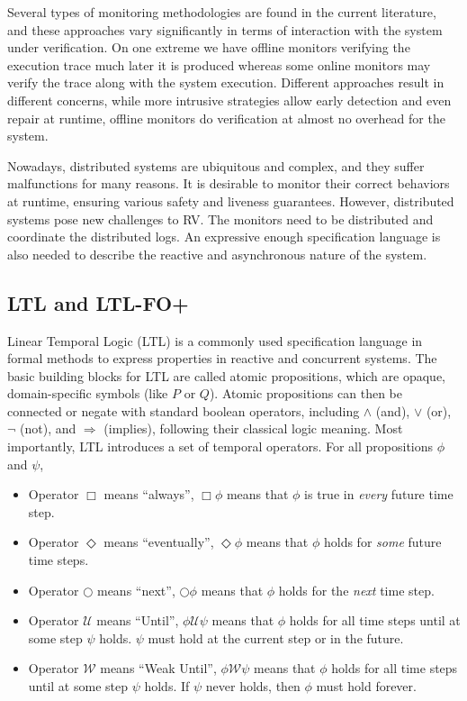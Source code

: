 \documentclass[format=acmsmall, nonacm=true, review=true, screen=true]{acmart}
\begin{document}
Several types of monitoring methodologies are found in the current literature, and these approaches vary significantly in terms of interaction with the system under verification. On one extreme we have offline monitors verifying the execution trace much later it is produced whereas some online monitors may verify the trace along with the system execution. Different approaches result in different concerns, while more intrusive strategies allow early detection and even repair at runtime, offline monitors do verification at almost no overhead for the system.

Nowadays, distributed systems are ubiquitous and complex, and they suffer malfunctions for many reasons. It is desirable to monitor their correct behaviors at runtime, ensuring various safety and liveness guarantees. However, distributed systems pose new challenges to RV. The monitors need to be distributed and coordinate the distributed logs. An expressive enough specification language is also needed to describe the reactive and asynchronous nature of the system.

\subsection{LTL and LTL-FO+}
Linear Temporal Logic (LTL) is a commonly used specification language in formal methods to express properties in reactive and concurrent systems. The basic building blocks for LTL are called atomic propositions, which are opaque, domain-specific symbols (like $P$ or $Q$). Atomic propositions can then be connected or negate with standard boolean operators, including $\land$ (and), $\lor$ (or), $\lnot$ (not), and $\Rightarrow$ (implies), following their classical logic meaning. Most importantly, LTL introduces a set of temporal operators. For all propositions $\phi$ and $\psi$,
\begin{itemize}
  \item Operator $\Box$ means ``always'', $\Box \phi$ means that $\phi$ is true in \textit{every} future time step.
  \item Operator $\Diamond$ means ``eventually'', $\Diamond \phi$ means that $\phi$ holds for \textit{some} future time steps.
  \item Operator $\bigcirc$ means ``next'', $\bigcirc \phi$ means that $\phi$ holds for the \textit{next} time step.
  \item Operator $\mathcal{U}$ means ``Until'', $\phi \mathcal{U}\psi$ means that $\phi$ holds for all time steps until at some step $\psi$ holds. $\psi$ must hold at the current step or in the future.
  \item Operator $\mathcal{W}$ means ``Weak Until'', $\phi \mathcal{W}\psi$ means that $\phi$ holds for all time steps until at some step $\psi$ holds. If $\psi$ never holds, then $\phi$ must hold forever.
\end{itemize}
\end{document}
